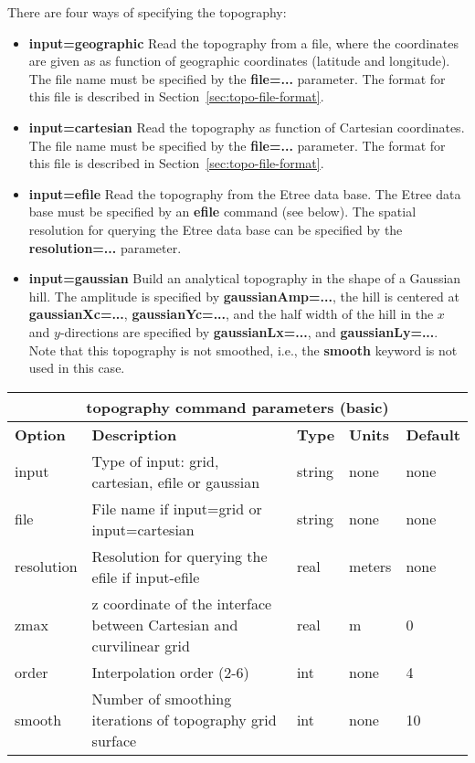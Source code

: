 \documentclass[11pt]{report}
\begin{document}
There are four ways of specifying the topography:
\begin{itemize}
\item {\bf input=geographic} Read the topography from a file, where the coordinates are given as as
  function of geographic coordinates (latitude and longitude). The file name must be specified by
  the {\bf file=...} parameter. The format for this file is described in Section~\ref{sec:topo-file-format}.
\item {\bf input=cartesian} Read the topography as function of Cartesian coordinates. The file name
   must be specified by the {\bf file=...} parameter. The format for this file is described in
   Section~\ref{sec:topo-file-format}.
\item {\bf input=efile} Read the topography from the Etree data base. The Etree data base must be
  specified by an {\bf efile} command (see below). The spatial resolution for querying the Etree
  data base can be specified by the {\bf resolution=...} parameter.
\item {\bf input=gaussian} Build an analytical topography in the shape of a Gaussian hill. The
  amplitude is specified by {\bf gaussianAmp=...}, the hill is centered at {\bf gaussianXc=...},
  {\bf gaussianYc=...}, and the half width of the hill in the $x$ and $y$-directions are specified by 
   {\bf gaussianLx=...}, and {\bf gaussianLy=...}. Note that this topography is not smoothed, i.e.,
   the {\bf smooth} keyword is not used in this case.
\end{itemize}
%
\begin{center}
\begin{tabular}{|l|p{8cm}|l|l|l|} \hline
\multicolumn{5}{|c|}{\bf topography command parameters (basic)}\\ \hline
\bf{Option} & \bf{Description} & \bf{Type} & \bf{Units} & \bf{Default}\\ \hline \hline
%
input & Type of input: grid, cartesian, efile or gaussian & string & none & none\\ \hline
%
file & File name if input=grid or input=cartesian & string & none & none\\ \hline
%
resolution & Resolution for querying the efile if input-efile & real & meters & none \\ \hline
%
zmax & z coordinate of the interface between  Cartesian and curvilinear grid& real &  m & 0\\ \hline
%
order & Interpolation order (2-6) & int & none & 4\\ \hline
%
smooth & Number of smoothing iterations of topography grid surface & int & none & 10 \\ \hline
\end{tabular}
\end{center}
\end{document}
